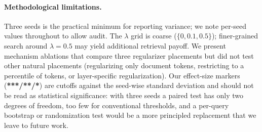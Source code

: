 \paragraph{Methodological limitations.} Three seeds is the practical minimum for reporting variance; we note per-seed values throughout to allow audit. The $\lambda$ grid is coarse ($\{0, 0.1, 0.5\}$); finer-grained search around $\lambda=0.5$ may yield additional retrieval payoff. We present mechanism ablations that compare three regularizer placements but did not test other natural placements (regularizing only document tokens, restricting to a percentile of tokens, or layer-specific regularization). Our effect-size markers (\textbf{***/**/*}) are cutoffs against the seed-wise standard deviation and should not be read as statistical significance: with three seeds a paired test has only two degrees of freedom, too few for conventional thresholds, and a per-query bootstrap or randomization test would be a more principled replacement that we leave to future work.

